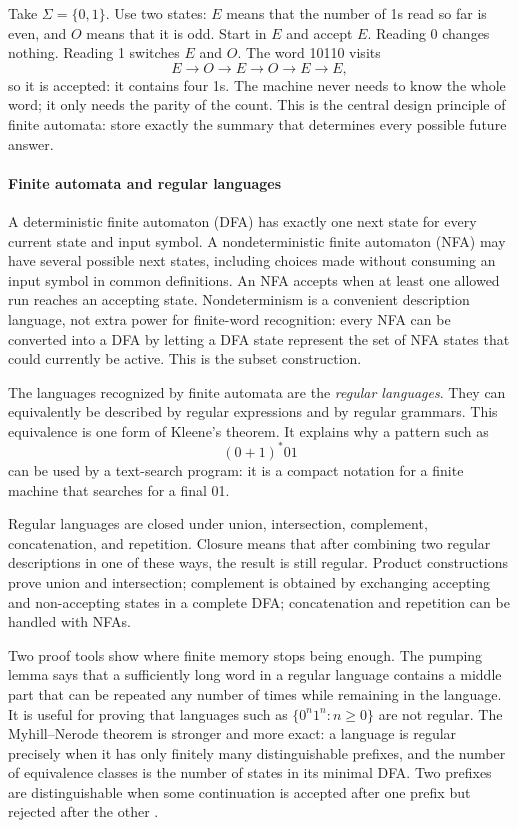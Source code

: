 Take $\Sigma=\{0,1\}$. Use two states: $E$ means that the number of 1s read so far is even, and $O$ means that it is odd. Start in $E$ and accept $E$. Reading 0 changes nothing. Reading 1 switches $E$ and $O$. The word 10110 visits
\[
 E\longrightarrow O\longrightarrow E\longrightarrow O\longrightarrow E\longrightarrow E,
\]
so it is accepted: it contains four 1s. The machine never needs to know the whole word; it only needs the parity of the count. This is the central design principle of finite automata: store exactly the summary that determines every possible future answer.

\paragraph{Finite automata and regular languages}

A deterministic finite automaton (DFA) has exactly one next state for every current state and input symbol. A nondeterministic finite automaton (NFA) may have several possible next states, including choices made without consuming an input symbol in common definitions. An NFA accepts when at least one allowed run reaches an accepting state. Nondeterminism is a convenient description language, not extra power for finite-word recognition: every NFA can be converted into a DFA by letting a DFA state represent the set of NFA states that could currently be active. This is the subset construction.

The languages recognized by finite automata are the \emph{regular languages}. They can equivalently be described by regular expressions and by regular grammars. This equivalence is one form of Kleene's theorem. It explains why a pattern such as
\[
 (0+1)^*01
\]
can be used by a text-search program: it is a compact notation for a finite machine that searches for a final 01.

Regular languages are closed under union, intersection, complement, concatenation, and repetition. Closure means that after combining two regular descriptions in one of these ways, the result is still regular. Product constructions prove union and intersection; complement is obtained by exchanging accepting and non-accepting states in a complete DFA; concatenation and repetition can be handled with NFAs.

Two proof tools show where finite memory stops being enough. The pumping lemma says that a sufficiently long word in a regular language contains a middle part that can be repeated any number of times while remaining in the language. It is useful for proving that languages such as $\{0^n1^n:n\geq0\}$ are not regular. The Myhill--Nerode theorem is stronger and more exact: a language is regular precisely when it has only finitely many distinguishable prefixes, and the number of equivalence classes is the number of states in its minimal DFA. Two prefixes are distinguishable when some continuation is accepted after one prefix but rejected after the other \cite{automata_theory_ref1,automata_theory_ref3}.

